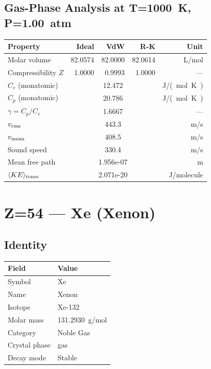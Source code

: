\documentclass[11pt,a4paper]{article}
\begin{document}
\subsection{Gas-Phase Analysis at T=\SI{1000}{K}, P=\SI{1.00}{atm}}
\begin{tabular}{lrrrr}
  \toprule
  Property & Ideal & VdW & R-K & Unit \\
  \midrule
  Molar volume & 82.0574 & 82.0000 & 82.0614 & \si{L/mol} \\
  Compressibility $Z$ & 1.0000 & 0.9993 & 1.0000 & --- \\
  \midrule
  $C_v$ (monatomic) & \multicolumn{3}{c}{12.472} & \si{J/(mol.K)} \\
  $C_p$ (monatomic) & \multicolumn{3}{c}{20.786} & \si{J/(mol.K)} \\
  $\gamma = C_p/C_v$ & \multicolumn{3}{c}{1.6667} & --- \\
  $v_{\rm rms}$ & \multicolumn{3}{c}{443.3} & \si{m/s} \\
  $v_{\rm mean}$ & \multicolumn{3}{c}{408.5} & \si{m/s} \\
  Sound speed & \multicolumn{3}{c}{330.4} & \si{m/s} \\
  Mean free path & \multicolumn{3}{c}{1.956e-07} & \si{m} \\
  $\langle KE \rangle_{\rm trans}$ & \multicolumn{3}{c}{2.071e-20} & \si{J/molecule} \\
  \bottomrule
\end{tabular}

\newpage

\section{Z=54 --- Xe (Xenon)}
\label{sec:Z54}

\subsection{Identity}
\begin{tabular}{ll}
  \toprule
  Field & Value \\
  \midrule
  Symbol & Xe \\
  Name & Xenon \\
  Isotope & Xe-132 \\
  Molar mass & \SI{131.2930}{g/mol} \\
  Category & Noble Gas \\
  Crystal phase & gas \\
  Decay mode & Stable \\
  \bottomrule
\end{tabular}
\end{document}
